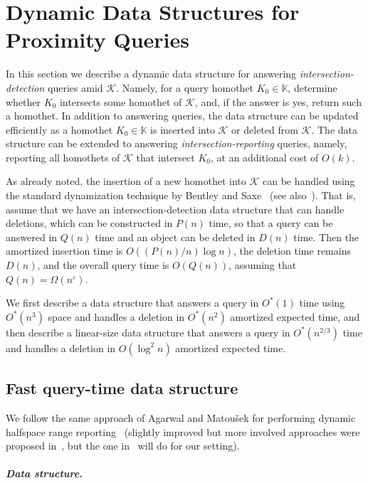 \documentclass[11pt]{article}
\newif\ifsocgproc
\newif\iffullver
\def\Kspace{{\mathbb K}}
\def\eps{{\varepsilon}}
\def\K{\mathcal{K}}
\theoremstyle{definition}
\begin{document}
\section{Dynamic Data Structures for Proximity Queries} \label{sec:ds}
%
In this section we describe a dynamic data structure for answering \emph{intersection-detection}
queries amid $\K$. Namely, for a query homothet $K_0 \in \Kspace$, determine whether $K_0$ intersects
some homothet of $\K$, and, if the answer is yes, return such a homothet.
In addition to answering queries, the data structure can be updated efficiently
as a homothet $K_0\in\Kspace$ is inserted into $\K$ or deleted from $\K$. 
The data structure can be extended to answering \emph{intersection-reporting} queries, namely,
reporting all homothets of $\K$ that intersect $K_0$, at an additional cost of $O(k)$. 
\iffullver
Using the parametric-search technique
(see, e.g., \cite{AM93,AM95}), a nearest-neighbor query under the $K$-distance can be reduced 
to answering $O(\log n)$ intersection-detection queries, so the cost increases by only a logarithmic factor.
\fi
%
As already noted, the insertion of a new homothet into $\K$ can be handled using the standard 
dynamization technique by Bentley and Saxe~\cite{BS80} (see also~\cite{AM95}).
That is, assume that we have an intersection-detection data structure that can handle deletions,
which can be constructed in $P(n)$ time, so that a query can be answered in $Q(n)$ time and an object can be deleted in $D(n)$ time.
Then the amortized insertion time is $O((P(n)/n)\log n)$, the deletion time remains $D(n)$, 
and the overall query time is $O(Q(n))$, assuming that $Q(n) = \Omega(n^\eps)$.
\iffullver
See \cite{BS80} for details.
\fi
%
We first describe a data structure that answers a query in $O^*(1)$ time using
$O^*(n^3)$ space and handles a deletion in $O^*(n^2)$ amortized expected time, and then describe a linear-size data 
structure that answers a query in $O^*(n^{2/3})$ time and handles a deletion in $O(\log^2 n)$ amortized expected time. 
\iffullver
Interpolating between these two setups, using standard techniques~\cite{AAEKS}, 
for a storage parameter $s\in [n,n^3]$, 
we can construct a structure of size $O^*(s)$, in $O^*(s)$ expected time,
that answers a query in $O^*(n/s^{1/3})$;
the amortized expected update time is $O^*(s/n)$.
\fi
%
\subsection{Fast query-time data structure}
\label{subsec:log}
%
We follow the same approach of Agarwal and Matou\v{s}ek for performing dynamic halfspace range 
reporting~\cite{AM95} (slightly improved but more involved approaches were proposed 
in~\cite{Chan:le,KMRSS}, but the one in~\cite{AM95} will do for our setting).  
%
\ifsocgproc 
\subparagraph*{Data structure.}
\else
\end{document}
